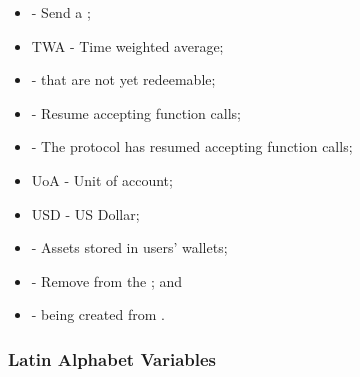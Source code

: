 \documentclass[class=article, crop=false]{standalone}
\begin{document}
\begin{itemize}[topsep=0pt, itemsep=3pt,leftmargin=16pt]
    \item[]  - Send a ;
    \item[] TWA - Time weighted average;
    \item[]  -  that are not yet redeemable;
    \item[]  - Resume accepting  function calls;
    \item[]  - The protocol has resumed accepting  function calls;
    \item[] UoA - Unit of account;
    \item[] USD - US Dollar;
    \item[]  - Assets stored in users' wallets;
    \item[]  - Remove from the ; and
    \item[]  -  being created from  \Pinto.
\end{itemize}


\subsubsection{Latin Alphabet Variables}
\end{document}

